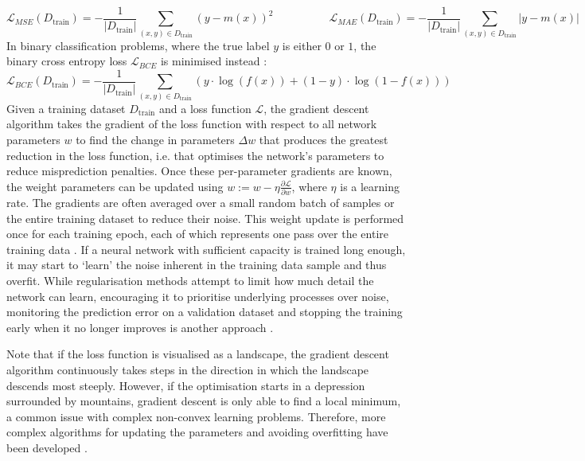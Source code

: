 \begin{equation*}
    \mathcal{L}_{MSE}(D_{\text{train}}) = -\frac{1}{|D_{\text{train}}|} \sum_{(x, y) \in D_{\text{train}}}{(y - m(x))^2} \quad \quad \quad \quad \quad \mathcal{L}_{MAE}(D_{\text{train}}) = -\frac{1}{|D_{\text{train}}|} \sum_{(x, y) \in D_{\text{train}}}{|y - m(x)|}
\end{equation*}
In binary classification problems, where the true label $y$ is either $0$ or $1$, the binary cross entropy loss $\mathcal{L}_{BCE}$ is minimised instead \cite{statistical-learning-2009}:
\begin{equation*}
    \mathcal{L}_{BCE}(D_{\text{train}}) = -\frac{1}{|D_{\text{train}}|} \sum_{(x, y) \in D_{\text{train}}}{\left( y \cdot \log(f(x)) + (1-y) \cdot \log(1-f(x)) \right)}
\end{equation*}
\noindent Given a training dataset $D_{\text{train}}$ and a loss function $\mathcal{L}$, the gradient descent algorithm takes the gradient of the loss function with respect to all network parameters $w$ to find the change in parameters $\Delta w$ that produces the greatest reduction in the loss function, i.e. that optimises the network's parameters to reduce misprediction penalties. Once these per-parameter gradients are known, the weight parameters can be updated using $w := w - \eta \frac{\partial \mathcal{L}}{\partial w}$, where $\eta$ is a learning rate. The gradients are often averaged over a small random batch of samples or the entire training dataset to reduce their noise. This weight update is performed once for each training epoch, each of which represents one pass over the entire training data \cite{statistical-learning-2009}. If a neural network with sufficient capacity is trained long enough, it may start to `learn' the noise inherent in the training data sample and thus overfit. While regularisation methods attempt to limit how much detail the network can learn, encouraging it to prioritise underlying processes over noise, monitoring the prediction error on a validation dataset and stopping the training early when it no longer improves is another approach \cite{machine-learning-1997, statistical-learning-2009}.

Note that if the loss function is visualised as a landscape, the gradient descent algorithm continuously takes steps in the direction in which the landscape descends most steeply. However, if the optimisation starts in a depression surrounded by mountains, gradient descent is only able to find a local minimum, a common issue with complex non-convex learning problems. Therefore, more complex algorithms for updating the parameters and avoiding overfitting have been developed \cite{gradient-descent-overview-2017}.

